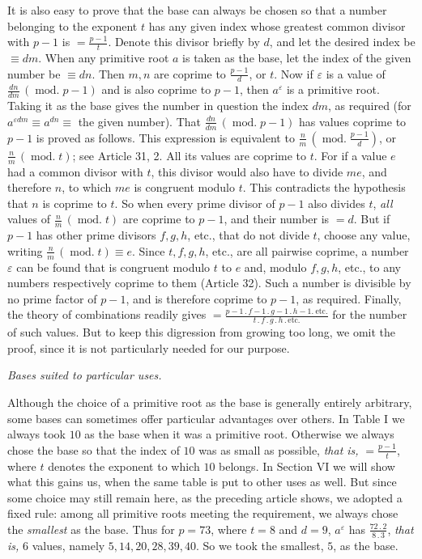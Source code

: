 It is also easy to prove that the base can always be chosen so that a number belonging to the exponent $t$ has any given index whose greatest common divisor with $p-1$ is $=\frac{p-1}{t}$. Denote this divisor briefly by $d$, and let the desired index be $\equiv dm$. When any
primitive root $a$ is taken as the base, let the index of the given number be $\equiv dn$. Then $m,n$ are coprime to $\frac{p-1}{d}$, or $t$. Now if $\varepsilon$ is a value of $\frac{dn}{dm}\,(\operatorname{mod.}p-1)$ and is also coprime to $p-1$, then $a^\varepsilon$ is a primitive root. Taking it as the base gives the number in question the index $dm$, as required (for $a^{\varepsilon dm}\equiv a^{dn}\equiv$ the given number). That $\frac{dn}{dm}\,(\operatorname{mod.}p-1)$ has values coprime to $p-1$ is proved as follows. This expression is equivalent to $\frac{n}{m}\,(\operatorname{mod.}\frac{p-1}{d})$, or $\frac{n}{m}\,(\operatorname{mod.}t)$; see Article 31, 2. All its values are coprime to $t$. For if a value $e$ had a common divisor with $t$, this divisor would also have to divide $me$, and therefore $n$, to which $me$ is congruent modulo $t$. This contradicts the hypothesis that $n$ is coprime to $t$. So when every prime divisor of $p-1$ also divides $t$, \emph{all} values of $\frac{n}{m}\,(\operatorname{mod.}t)$ are coprime to $p-1$, and their number is $=d$. But if $p-1$ has other prime divisors $f,g,h$, etc., that do not divide $t$, choose any value, writing $\frac{n}{m}\,(\operatorname{mod.}t)\equiv e$. Since $t,f,g,h$, etc., are all pairwise coprime, a number $\varepsilon$ can be found that is congruent modulo $t$ to $e$ and, modulo $f,g,h$, etc., to any numbers respectively coprime to them (Article 32). Such a number is divisible by no prime factor of $p-1$, and is therefore coprime to $p-1$, as required. Finally, the theory of combinations readily gives $=\frac{p-1\,.\,f-1\,.\,g-1\,.\,h-1.\ \mathrm{etc.}}{t\,.\,f\,.\,g\,.\,h\,.\,\mathrm{etc.}}$ for the number of such values. But to keep this digression from growing too long, we omit the proof, since it is not particularly needed for our purpose.

\begin{center}\emph{Bases suited to particular uses.}\end{center}

Although the choice of a primitive root as the base is generally entirely arbitrary, some bases can sometimes offer particular advantages over others. In Table I we always took $10$ as the base when it was a primitive root. Otherwise we always chose the base so that the index of $10$ was as small as possible, \emph{that is,} $=\frac{p-1}{t}$, where $t$ denotes the exponent to which $10$ belongs. In Section VI we will show what this gains us, when the same table is put to other uses as well. But since some choice may still remain here, as the preceding article shows, we adopted a fixed rule: among all primitive roots meeting the requirement, we always chose the \emph{smallest} as the base. Thus for $p=73$, where $t=8$ and $d=9$, $a^\varepsilon$ has $\frac{72\,.\,2}{8\,.\,3}$, \emph{that is,} $6$ values, namely $5,14,20,28,39,40$. So we took the smallest, $5$, as the base.
